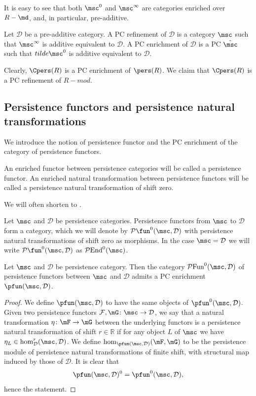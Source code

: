 It is easy to see that both $\msc^0$ and $\msc^\infty$ are categories enriched over $R-\md$, and, in particular, pre-additive.

\begin{dfn}
    Let $\mathcal{D}$ be a pre-additive category. A PC refinement of $\mathcal{D}$ is a category $\msc$ such that $\msc^\infty$ is additive equivalent to $\mathcal{D}$. A PC enrichment of $\mathcal{D}$ is a PC $\tilde \msc $ such that $tilde{\msc^0}$ is additive equivalent to $\mathcal{D}$.
\end{dfn}

Clearly, $\Cpers(R)$ is a PC enrichment of $\pers(R)$. We claim that $\Cpers(R)$ is a PC refinement of $R-mod$.

\subsection{Persistence functors and persistence natural transformations}
We introduce the notion of persistence functor and the PC enrichment of the category of persistence functors.
\begin{dfn}
    An enriched functor between persistence categories will be called a persistence functor. An enriched natural transformation between persistence functors will be called a persistence natural transformation of shift zero.
\end{dfn}
\noindent We will often shorten  to .

Let $\msc$ and $\mathcal{D}$ be persistence categories. Persistence functors from $\msc$ to $\mathcal{D}$ form a category, which we will denote by $\mathcal{P}\fun^0(\msc,\mathcal{D})$ with persistence natural transformations of shift zero as morphisms. In the case $\msc=\mathcal{D}$ we will write $\mathcal{P}\fun^0(\msc,\mathcal{D})$ as $\mathcal{P}\text{End}^0(\msc)$. 

\begin{lem}
    Let $\msc$ and $\mathcal{D}$ be persistence category. Then the category $\mathcal{P}\text{Fun}^0(\msc,\mathcal{D})$ of persistence functors between $\msc$ and $\mathcal{D}$ admits a PC enrichment $\pfun(\msc,\mathcal{D})$.
\end{lem}
\begin{proof}
    We define $\pfun(\msc,\mathcal{D})$ to have the same objects of $\pfun^0(\msc,\mathcal{D})$. Given two persistence functors $\mathcal{F}, \mG\colon \msc\to \mathcal{D}$, we say that a natural transformation $\eta\colon \mF\to \mG$ between the underlying functors is a persistence natural transformation of shift $r\in \mathbb{R}$ if for any object $L$ of $\msc$ we have $\eta_L\in \hom_\mathcal{D}^r(\msc,\mathcal{D})$. We define $\hom_{\pfun(\msc,\mathcal{D})}(\mF,\mG)$ to be the persistence module of persistence natural transformations of finite shift, with structural map induced by those of $\mathcal{D}$. It is clear that $$\pfun(\msc,\mathcal{D})^0= \pfun^0(\msc,\mathcal{D}),$$ hence the statement.
\end{proof}

